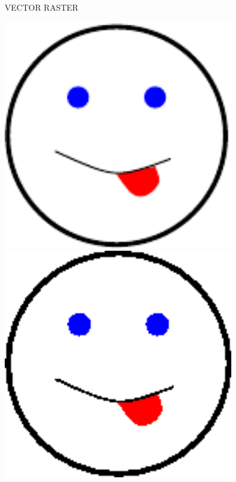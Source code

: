 \documentclass[11pt]{article}
\begin{document}
\newpage
\thispagestyle{empty}
\begin{sideways}
\begin{minipage}{8.5in}
\begin{center}
VECTOR \hspace{4in} RASTER

\vspace{0.9in}
\includegraphics[width=4in]{dopey.pdf}
\includegraphics[width=4in]{dopey.png}
\end{center}
\end{minipage}
\end{sideways}
\newpage
\thispagestyle{empty}
\end{document}
